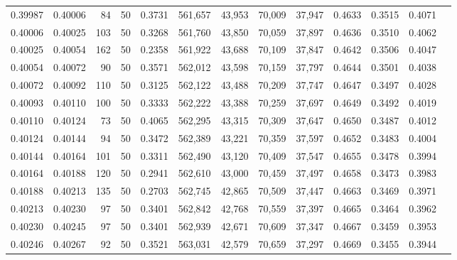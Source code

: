 \begin{tabular}{rrrrrrrrrrrrr}
0.39987 & 0.40006 &    84 &  50 &                                     0.3731 & 561,657 &  43,953 &  70,009 &  37,947 & 0.4633 & 0.3515 & 0.4071 \\
0.40006 & 0.40025 &   103 &  50 &                                     0.3268 & 561,760 &  43,850 &  70,059 &  37,897 & 0.4636 & 0.3510 & 0.4062 \\
0.40025 & 0.40054 &   162 &  50 &                                     0.2358 & 561,922 &  43,688 &  70,109 &  37,847 & 0.4642 & 0.3506 & 0.4047 \\
0.40054 & 0.40072 &    90 &  50 &                                     0.3571 & 562,012 &  43,598 &  70,159 &  37,797 & 0.4644 & 0.3501 & 0.4038 \\
0.40072 & 0.40092 &   110 &  50 &                                     0.3125 & 562,122 &  43,488 &  70,209 &  37,747 & 0.4647 & 0.3497 & 0.4028 \\
0.40093 & 0.40110 &   100 &  50 &                                     0.3333 & 562,222 &  43,388 &  70,259 &  37,697 & 0.4649 & 0.3492 & 0.4019 \\
0.40110 & 0.40124 &    73 &  50 &                                     0.4065 & 562,295 &  43,315 &  70,309 &  37,647 & 0.4650 & 0.3487 & 0.4012 \\
0.40124 & 0.40144 &    94 &  50 &                                     0.3472 & 562,389 &  43,221 &  70,359 &  37,597 & 0.4652 & 0.3483 & 0.4004 \\
0.40144 & 0.40164 &   101 &  50 &                                     0.3311 & 562,490 &  43,120 &  70,409 &  37,547 & 0.4655 & 0.3478 & 0.3994 \\
0.40164 & 0.40188 &   120 &  50 &                                     0.2941 & 562,610 &  43,000 &  70,459 &  37,497 & 0.4658 & 0.3473 & 0.3983 \\
0.40188 & 0.40213 &   135 &  50 &                                     0.2703 & 562,745 &  42,865 &  70,509 &  37,447 & 0.4663 & 0.3469 & 0.3971 \\
0.40213 & 0.40230 &    97 &  50 &                                     0.3401 & 562,842 &  42,768 &  70,559 &  37,397 & 0.4665 & 0.3464 & 0.3962 \\
0.40230 & 0.40245 &    97 &  50 &                                     0.3401 & 562,939 &  42,671 &  70,609 &  37,347 & 0.4667 & 0.3459 & 0.3953 \\
0.40246 & 0.40267 &    92 &  50 &                                     0.3521 & 563,031 &  42,579 &  70,659 &  37,297 & 0.4669 & 0.3455 & 0.3944 \\

\end{tabular}
